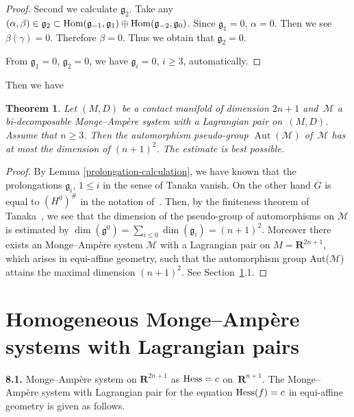 \documentclass[11pt]{article}
\newtheorem{Th}{Theorem}[section]
\begin{document}
\begin{proof}
Second we calculate ${\mathfrak g}_2$. Take any $(\alpha, \beta) \in {\mathfrak g}_2 \subset
{\rm Hom}({\mathfrak g}_{-1}, {\mathfrak g}_{1})\oplus
{\rm Hom}({\mathfrak g}_{-2}, {\mathfrak g}_{0})$.
Since ${\mathfrak g}_{1} = 0$, $\alpha = 0$. Then we see $\beta(\gamma) = 0$. Therefore $\beta = 0$.
Thus we obtain that ${\mathfrak g}_{2} = 0$.

From ${\mathfrak g}_{1} = 0$, ${\mathfrak g}_{2} = 0$, we have ${\mathfrak g}_{i} = 0$, $i \geq 3$, automatically.
\end{proof}

Then we have

\begin{Th}
\label{maximal symmetry}
Let $(M, D)$ be a contact manifold of dimension $2n+1$
and~$\mathcal{M}$
a bi-decomposable Monge--Amp{\`e}re system
with a Lagrangian pair on~$(M,D)$.
Assume that $n \geq 3$.
Then the automorphism pseudo-group $\operatorname{Aut}(\mathcal{M})$
of~$\mathcal{M}$ has
at most the dimension of
$(n+1)^2$. The estimate is best possible.
\end{Th}

\begin{proof}
By Lemma \ref{prolongation-calculation},
we have known that the prolongations ${\mathfrak g}_i$, $1 \leq i$ in the sense of Tanaka vanish.
On the other hand $\overline{G}$ is equal to $(H^0)^{\#}$ in the notation of~\cite{Tan}.
Then, by the f\/initeness theorem of Tanaka~\cite[Corollary~2]{Tan}, we see that
the dimension of the pseudo-group of automorphisms on ${\mathcal M}$ is estimated by
$\dim({\mathfrak g^0}) = \sum\limits_{i \leq 0} \dim({\mathfrak g}_i) = (n+1)^2$.
Moreover there exists an Monge--Amp{\`e}re system $\mathcal{M}$ with a Lagrangian pair on
$M = {\mathbf{R}}^{2n+1}$, which arises in equi-af\/f\/ine geometry, such that
the automorphism group {\rm Aut}($\mathcal{M}$) attains the maximal dimension $(n+1)^2$.
See Section~\ref{Homogeneous M-A systems with Lagrangian pairs.}.1.
\end{proof}
\setcounter{section}{7}
\setcounter{subsection}{0}
\setcounter{subsubsection}{0}
\setcounter{Th}{4}
\setcounter{equation}{0}
\section{Homogeneous Monge--Amp{\`e}re systems with Lagrangian pairs}
\label{Homogeneous M-A systems with Lagrangian pairs.}

{\bf 8.1.}
Monge--Amp{\`e}re system on ${\mathbf{R}}^{2n+1}$ as
${\rm Hess} = c$ on~${\mathbf{R}}^{n+1}$.
The Monge--Amp{\`e}re system with Lagrangian pair
for the equation ${\rm Hess}(f)= c$
in equi-af\/f\/ine geometry is given as follows.
\end{document}
